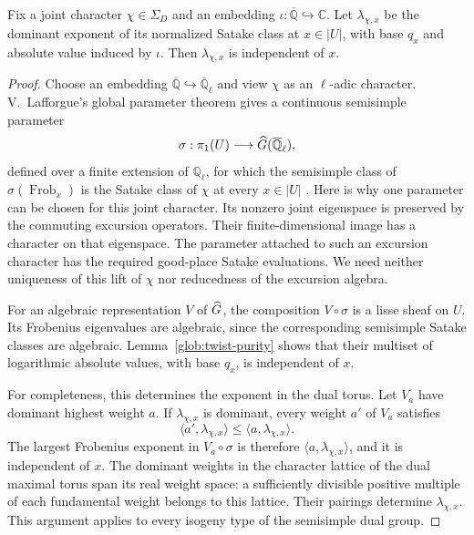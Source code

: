 \begin{proposition}\label{glob:place}
Fix a joint character $\chi\in\Sigma_D$ and an embedding
$\iota:\overline{\mathbb Q}\hookrightarrow\mathbb C$.
Let $\lambda_{\chi,x}$ be the dominant exponent of its normalized
Satake class at $x\in|U|$, with base $q_x$ and absolute value induced
by $\iota$.  Then $\lambda_{\chi,x}$ is independent of $x$.
\end{proposition}

\begin{proof}
Choose an embedding
$\overline{\mathbb Q}\hookrightarrow\overline{\mathbb Q}_\ell$ and
view $\chi$ as an $\ell$-adic character.  V.~Lafforgue's global
parameter theorem gives a continuous semisimple parameter
\[
     \sigma:\pi_1(U)\longrightarrow\widehat G(\overline{\mathbb Q}_\ell),
\]
defined over a finite extension of $\mathbb Q_\ell$, for which
the semisimple class of $\sigma(\operatorname{Frob}_x)$ is the Satake
class of $\chi$ at every $x\in|U|$
\cite[Theorem~1.1]{VLafforgue}.  Here is why one parameter can be
chosen for this joint character.  Its nonzero joint eigenspace is
preserved by the commuting excursion operators.  Their
finite-dimensional image has a character on that eigenspace.
The parameter attached to such an excursion character has the
required good-place Satake evaluations.  We need neither uniqueness
of this lift of $\chi$ nor reducedness of the excursion algebra.

For an algebraic representation $V$ of $\widehat G$, the composition
$V\circ\sigma$ is a lisse sheaf on $U$.  Its Frobenius eigenvalues
are algebraic, since the corresponding semisimple Satake classes
are algebraic.  Lemma~\ref{glob:twist-purity} shows that their
multiset of logarithmic absolute values, with base $q_x$, is
independent of $x$.

For completeness, this determines the exponent in the dual torus.
Let $V_a$ have dominant highest weight $a$.  If
$\lambda_{\chi,x}$ is dominant, every weight $a'$ of $V_a$ satisfies
\[
       \langle a',\lambda_{\chi,x}\rangle
          \le\langle a,\lambda_{\chi,x}\rangle.
\]
The largest Frobenius exponent in $V_a\circ\sigma$ is therefore
$\langle a,\lambda_{\chi,x}\rangle$, and it is independent of $x$.
The dominant weights in the character lattice of the dual maximal
torus span its real weight space: a sufficiently divisible positive
multiple of each fundamental weight belongs to this lattice.
Their pairings determine
$\lambda_{\chi,x}$.  This argument applies to every isogeny type
of the semisimple dual group.
\end{proof}

